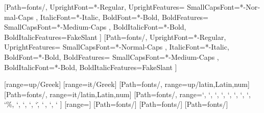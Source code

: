 

\usepackage{amsmath}
\usepackage{mathtools}

\usepackage[quiet]{fontspec}
\usepackage{unicode-math}
\setmainfont{Meta}[Path={fonts/},
	UprightFont=*-Regular,
	UprightFeatures={
		SmallCapsFont={*-Normal-Caps}
	},
	ItalicFont=*-Italic,
	BoldFont=*-Bold,
	BoldFeatures={
		SmallCapsFont={*-Medium-Caps}
	},
	BoldItalicFont=*-Bold,
	BoldItalicFeatures={FakeSlant}
]
\setsansfont{Meta}[Path={fonts/},
	UprightFont=*-Regular,
	UprightFeatures={
		SmallCapsFont={*-Normal-Caps}
	},
	ItalicFont=*-Italic,
	BoldFont=*-Bold,
	BoldFeatures={
		SmallCapsFont={*-Medium-Caps}
	},
	BoldItalicFont=*-Bold,
	BoldItalicFeatures={FakeSlant}
]

[range=up/{Greek}]
[range=it/{Greek}]
[Path={fonts/}, range=up/{latin,Latin,num}]
[Path={fonts/}, range=it/{latin,Latin,num}]
[Path={fonts/},
	range={`\+, `\-, `\×, `\÷, `\⋅, `\*, `\/, `\±, `\%, `\‰, `\!, `\?,
		`\., `\,, `\:, `\;}
]
[range=\int]
\setmathfontface{}[Path={fonts/}]
\setmathfontface{}[Path={fonts/}]
\setmathfontface{}[Path={fonts/}]

\usepackage{polyglossia}
\setmainlanguage{german}

\usepackage[pantone312]{wwustyle}
\usepackage{microtype}
\usepackage{selnolig}
\usepackage{csquotes}

\usepackage{graphicx}
\usepackage{gincltex}
\usepackage{grffile}
\usepackage[useregional]{datetime2}
\usepackage{multirow}
\usepackage{siunitx}

\renewcommand{\arraystretch}{1.3}
\hypersetup{unicode}

